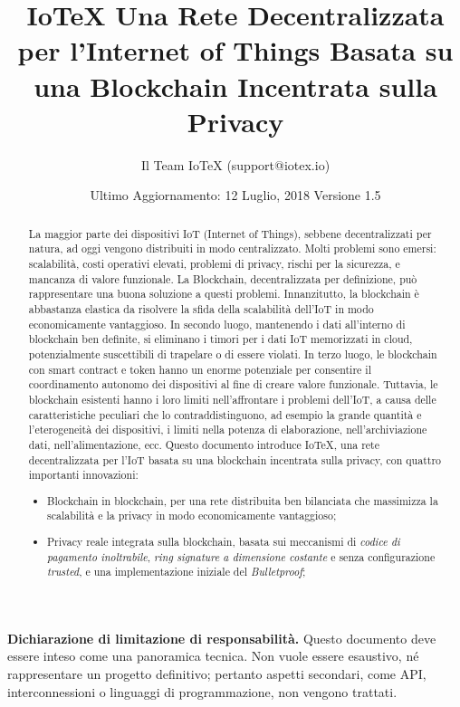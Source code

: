\documentclass[a4paper,12pt]{article}
\title{
	IoTeX
	\linebreak
	\Large Una Rete Decentralizzata per l'Internet of Things
	\linebreak
	\Large Basata su una Blockchain Incentrata sulla Privacy}
\author{Il Team IoTeX (support@iotex.io)}
\date{Ultimo Aggiornamento: 12 Luglio, 2018
	\linebreak Versione 1.5
	}
\begin{document}
\maketitle

\vspace{200pt}


\textbf{Dichiarazione di limitazione di responsabilità.} Questo documento deve essere inteso come una panoramica tecnica. Non vuole essere esaustivo, né rappresentare un progetto definitivo; pertanto aspetti secondari, come API, interconnessioni o linguaggi di programmazione, non vengono trattati.

\pagebreak

\begin{abstract}
	La maggior parte dei dispositivi IoT (Internet of Things), sebbene decentralizzati per natura, ad oggi vengono distribuiti in modo centralizzato. Molti problemi sono emersi: scalabilità, costi operativi elevati, problemi di privacy, rischi per la sicurezza, e mancanza di valore funzionale. La Blockchain, decentralizzata per definizione, può rappresentare una buona soluzione a questi problemi. Innanzitutto, la blockchain è abbastanza elastica da risolvere la sfida della scalabilità dell'IoT in modo economicamente vantaggioso. In secondo luogo, mantenendo i dati all'interno di blockchain ben definite, si eliminano i timori per i dati IoT memorizzati in cloud, potenzialmente suscettibili di trapelare o di essere violati. In terzo luogo, le blockchain con smart contract e token hanno un enorme potenziale per consentire il coordinamento autonomo dei dispositivi al fine di creare valore funzionale. Tuttavia, le blockchain esistenti hanno i loro limiti nell'affrontare i problemi dell'IoT, a causa delle caratteristiche peculiari che lo contraddistinguono, ad esempio la grande quantità e l'eterogeneità dei dispositivi, i limiti nella potenza di elaborazione, nell'archiviazione dati, nell'alimentazione, ecc.
	Questo documento introduce IoTeX, una rete decentralizzata per l'IoT basata su una blockchain incentrata sulla privacy, con quattro importanti innovazioni:

	\begin{itemize}

		\item
		      Blockchain in blockchain, per una rete distribuita ben bilanciata che massimizza la scalabilità e la privacy in modo economicamente vantaggioso;

		\item
		      Privacy reale integrata sulla blockchain, basata sui meccanismi di \emph{codice di pagamento inoltrabile}, \emph{ring signature a dimensione costante} e senza configurazione \emph{trusted}, e una implementazione iniziale del \emph{Bulletproof};


\end{itemize}
\end{abstract}
\end{document}
